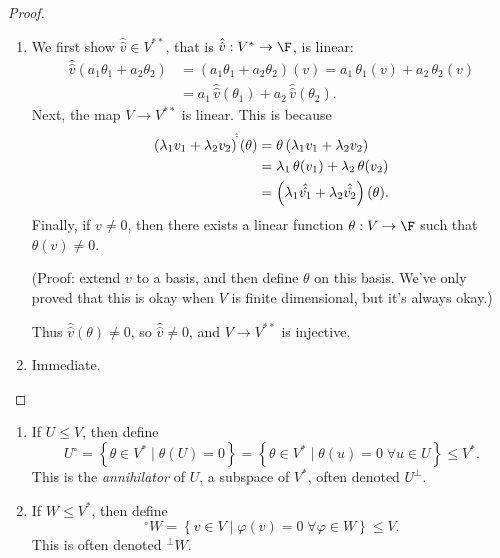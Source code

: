 \begin{proof}
\mbox{}
\begin{enumerate}
	\item We first show $\hat{\hat{v}}\in V^{**}$, that is $\hat{\hat{v}}:V^*\to\F$, is linear: %
	\begin{align*}
		\hat{\hat{v}} (a_1\theta_1+a_2\theta_2)
		&= (a_1\theta_1+a_2\theta_2)(v) = a_1\,\theta_1(v) + a_2 \,\theta_2(v) \\
		&= a_1\,\hat{\hat{v}}(\theta_1) + a_2\,\hat{\hat{v}}(\theta_2).
	\end{align*}
	Next, the map $V\to V^{**}$ is linear. This is because
	\begin{align*}
		\left( \lambda_1 v_1 + \lambda_2 v_2 \right)^{\hat\hat}(\theta)
		&= \theta\left( \lambda_1 v_1 + \lambda_2 v_2 \right) \\
		&= \lambda_1\,\theta(v_1) + \lambda_2\,\theta(v_2) \\
		&= \left( \lambda_1 \hat{\hat{v_1}} + \lambda_2 \hat{\hat{v_2}} \right)(\theta).
	\end{align*}
	Finally, if $v\neq 0$, then there exists a linear function $\theta:V\to\F$ such that $\theta(v)\neq 0$. %
	
	(Proof: extend $v$ to a basis, and then define $\theta$ on this basis. We've only proved that this is okay when $V$ is finite dimensional, but it's always okay.) %
	
	Thus $\hat{\hat{v}}(\theta)\neq 0$, so $\hat{\hat{v}}\neq 0$, and $V\to V^{**}$ is injective. %
	\item Immediate. \qedhere
\end{enumerate}
\end{proof}

\begin{definition}
\mbox{}
\begin{enumerate}
	\item If $U\leq V$, then define
	\begin{equation*}
		U^\circ = \left\{\theta\in V^* \mid \theta(U)=0\right\}
		= \left\{\theta\in V^* \mid \theta(u) = 0 \;\forall u\in U\right\}
		\leq V^*.
	\end{equation*}
	This is the \emph{annihilator} of $U$, a subspace of $V^*$, often denoted $U^\perp$. %
	\item If $W\leq V^*$, then define
	\begin{equation*}
		{}^\circ W = \left\{v\in V \mid \varphi(v)=0\;\forall\varphi\in W\right\}\leq V.
	\end{equation*}
	This is often denoted $^\perp W$.
\end{enumerate}
\end{definition}

